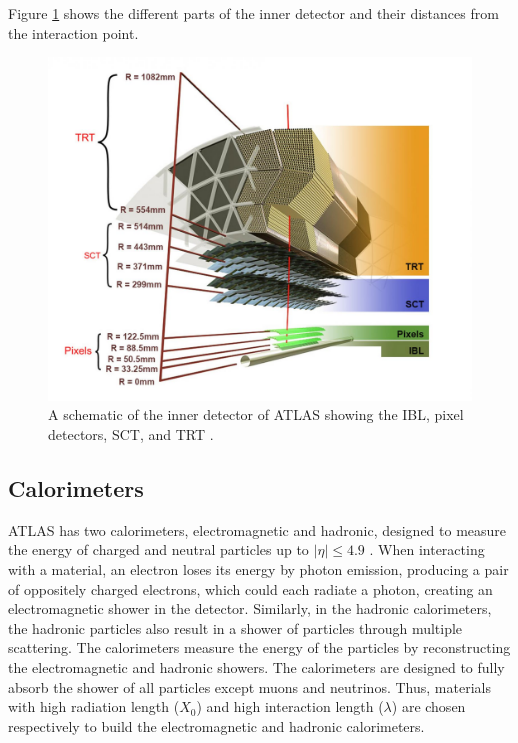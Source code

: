 Figure \ref{fig:ATLAS_ID} shows the different parts of the inner detector and their distances from the interaction point.

\begin{figure}[!htb]
    \centering
    \includegraphics[width=.98\linewidth]{figures/LHC/ATLAS_InnerDetector.jpg}
    \caption{ A schematic of the inner detector of ATLAS showing the IBL, pixel detectors, SCT, and TRT \cite{ID_Align_Run2}.\label{fig:ATLAS_ID}}
\end{figure}

\subsection{Calorimeters}
\label{subsec:Cal}

ATLAS has two calorimeters, electromagnetic and hadronic, designed to measure the energy of charged and neutral particles up to $|\eta|\leq4.9$ \cite{ATLAS}. When interacting with a material, an electron loses its energy by photon emission, producing a pair of oppositely charged electrons, which could each radiate a photon, creating an electromagnetic shower in the detector. Similarly, in the hadronic calorimeters, the hadronic particles also result in a shower of particles through multiple scattering. The calorimeters measure the energy of the particles by reconstructing the electromagnetic and hadronic showers. The calorimeters are designed to fully absorb the shower of all particles except muons and neutrinos. Thus, materials with high radiation length ($X_{0}$) and high interaction length ($\lambda$) are chosen respectively to build the electromagnetic and hadronic calorimeters.

